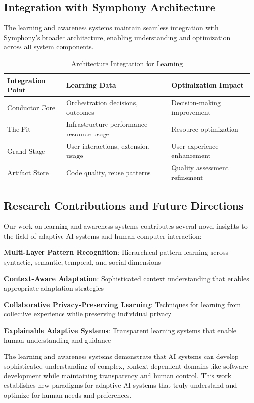 \subsection*{Integration with Symphony Architecture}

The learning and awareness systems maintain seamless integration with Symphony's broader architecture, enabling understanding and optimization across all system components.

\begin{table}[ht]
\centering
\begin{tabular}{@{}lll@{}}
\toprule
\textbf{Integration Point} & \textbf{Learning Data} & \textbf{Optimization Impact} \\
\midrule
Conductor Core & Orchestration decisions, outcomes & Decision-making improvement \\
The Pit & Infrastructure performance, resource usage & Resource optimization \\
Grand Stage & User interactions, extension usage & User experience enhancement \\
Artifact Store & Code quality, reuse patterns & Quality assessment refinement \\
\bottomrule
\end{tabular}
\caption{Architecture Integration for Learning}
\end{table}

\subsection*{Research Contributions and Future Directions}

Our work on learning and awareness systems contributes several novel insights to the field of adaptive AI systems and human-computer interaction:

\begin{expandedlist}
    \item \textbf{Multi-Layer Pattern Recognition}: Hierarchical pattern learning across syntactic, semantic, temporal, and social dimensions
    \item \textbf{Context-Aware Adaptation}: Sophisticated context understanding that enables appropriate adaptation strategies
    \item \textbf{Collaborative Privacy-Preserving Learning}: Techniques for learning from collective experience while preserving individual privacy
    \item \textbf{Explainable Adaptive Systems}: Transparent learning systems that enable human understanding and guidance
\end{expandedlist}

The learning and awareness systems demonstrate that AI systems can develop sophisticated understanding of complex, context-dependent domains like software development while maintaining transparency and human control. This work establishes new paradigms for adaptive AI systems that truly understand and optimize for human needs and preferences.
